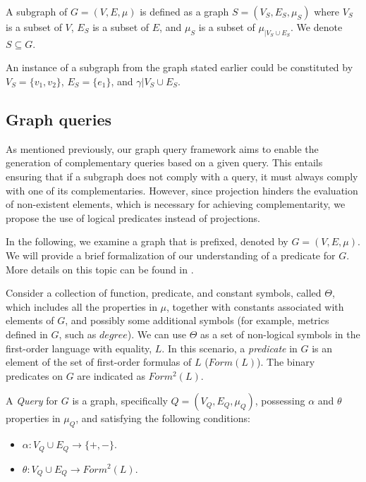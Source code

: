 \documentclass{article}%
\begin{document}
\begin{definition}{}
    A subgraph of $G = (V, E,\mu)$ is defined as a graph $S = (V_S, E_S,\mu_S)$ where $V_S$ is a subset of $V$, $E_S$ is a subset of $E$, and $\mu_S$ is a subset of $\mu_{|V_S \cup E_S}$. We denote $S \subseteq G$. 
\end{definition}

An instance of a subgraph from the graph stated earlier could be constituted by $V_S=\{v_1,v_2\}$, $E_S=\{e_1\}$, and $\gamma{|V_S \cup E_S}$.

\subsection{Graph queries}

As mentioned previously, our graph query framework aims to enable the generation of complementary queries based on a given query. This entails ensuring that if a subgraph does not comply with a query, it must always comply with one of its complementaries. However, since projection hinders the evaluation of non-existent elements, which is necessary for achieving complementarity, we propose the use of logical predicates instead of projections. 

In the following, we examine a graph that is prefixed, denoted by $G=(V,E,\mu)$. We will provide a brief formalization of our understanding of a predicate for $G$. More details on this topic can be found in \cite{Bonifati}.

Consider a collection of function, predicate, and constant symbols, called $\Theta$, which includes all the properties in $\mu$, together with constants associated with elements of $G$, and possibly some additional symbols (for example, metrics defined in $G$, such as $degree$). We can use $\Theta$ as a set of non-logical symbols in the first-order language with equality, $L$. In this scenario, a \textit{predicate} in $G$ is an element of the set of first-order formulas of $L$ ($Form(L)$). The binary predicates on $G$ are indicated as $Form^2(L)$.

\begin{definition}{}
    A \emph{Query} for $G$ is a graph, specifically $Q = (V_Q, E_Q, \mu_Q)$, possessing $\alpha$ and $\theta$ properties in $\mu_Q$, and satisfying the following conditions:
    \begin{itemize}
        \item $\alpha:V_Q\cup E_Q\rightarrow \{+,-\}$.
        \item $\theta:V_Q\cup E_Q\rightarrow Form^2(L)$.
    \end{itemize}
\end{definition}\medskip
\end{document}
